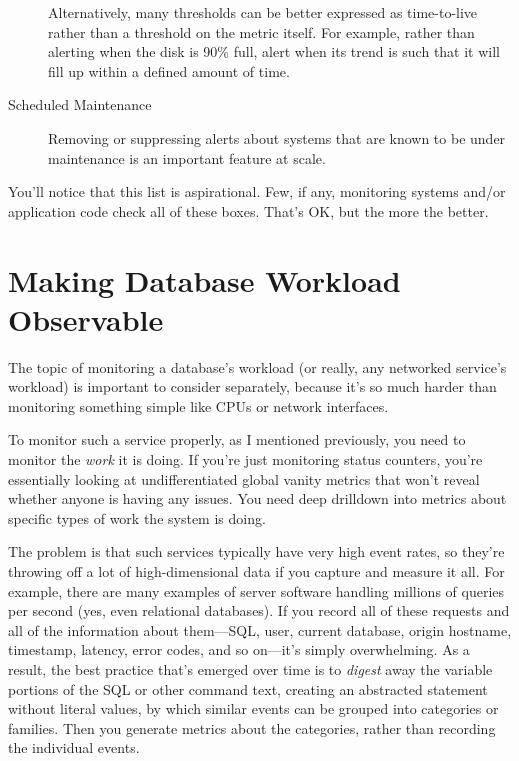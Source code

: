 \documentclass{vivid_layout}
\begin{document}
\begin{description}
Alternatively, many thresholds can be better expressed as time-to-live rather
than a threshold on the metric itself. For example, rather than alerting when
the disk is 90\% full, alert when its trend is such that it will fill up within
a defined amount of time.

\item[Scheduled Maintenance] Removing or suppressing alerts about systems that
are known to be under maintenance is an important feature at scale.

\end{description}

You'll notice that this list is aspirational. Few, if any, monitoring systems
and/or application code check all of these boxes. That's OK, but the more the
better.

\section{Making Database Workload Observable}

The topic of monitoring a database's workload (or really, any networked
service's workload) is important to consider separately, because it's so much
harder than monitoring something simple like CPUs or network interfaces.

To monitor such a service properly, as I mentioned previously, you need to
monitor the \emph{work} it is doing. If you're just monitoring status counters,
you're essentially looking at undifferentiated global vanity metrics that won't
reveal whether anyone is having any issues. You need deep drilldown into metrics
about specific types of work the system is doing.

The problem is that such services typically have very high event rates, so
they're throwing off a lot of high-dimensional data if you capture and measure
it all. For example, there are many examples of server software handling
millions of queries per second (yes, even relational databases). If you record
all of these requests and all of the information about them---SQL, user, current
database, origin hostname, timestamp, latency, error codes, and so on---it's simply
overwhelming. As a result, the best practice that's emerged over time is to
\emph{digest} away the variable portions of the SQL or other command text,
creating an abstracted statement without literal values, by which similar events
can be grouped into categories or families. Then you generate metrics about the
categories, rather than recording the individual events.
\end{document}
